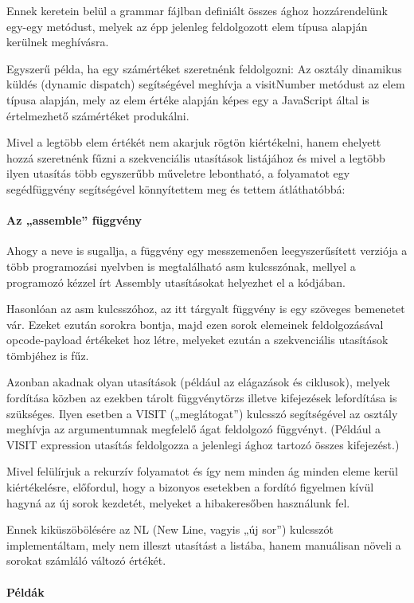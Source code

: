 Ennek keretein belül a grammar fájlban definiált összes ághoz hozzárendelünk egy-egy metódust, melyek az épp jelenleg feldolgozott elem típusa alapján kerülnek meghívásra.

Egyszerű példa, ha egy számértéket szeretnénk feldolgozni: Az osztály dinamikus küldés (dynamic dispatch) segítségével meghívja a visitNumber metódust az elem típusa alapján, mely az elem értéke alapján képes egy a JavaScript által is értelmezhető számértéket produkálni.

Mivel a legtöbb elem értékét nem akarjuk rögtön kiértékelni, hanem ehelyett hozzá szeretnénk fűzni a szekvenciális utasítások listájához és mivel a legtöbb ilyen utasítás több egyszerűbb műveletre lebontható, a folyamatot egy segédfüggvény segítségével könnyítettem meg és tettem átláthatóbbá:

\paragraph{Az „assemble” függvény}

Ahogy a neve is sugallja, a függvény egy messzemenően leegyszerűsített verziója a több programozási nyelvben is megtalálható asm kulcsszónak, mellyel a programozó kézzel írt Assembly utasításokat helyezhet el a kódjában.

Hasonlóan az asm kulcsszóhoz, az itt tárgyalt függvény is egy szöveges bemenetet vár. Ezeket ezután sorokra bontja, majd ezen sorok elemeinek feldolgozásával opcode-payload értékeket hoz létre, melyeket ezután a szekvenciális utasítások tömbjéhez is fűz.

Azonban akadnak olyan utasítások (például az elágazások és ciklusok), melyek fordítása közben az ezekben tárolt függvénytörzs illetve kifejezések lefordítása is szükséges. Ilyen esetben a VISIT („meglátogat”) kulcsszó segítségével az osztály meghívja az argumentumnak megfelelő ágat feldolgozó függvényt. (Például a VISIT expression utasítás feldolgozza a jelenlegi ághoz tartozó összes kifejezést.)

Mivel felülírjuk a rekurzív folyamatot és így nem minden ág minden eleme kerül kiértékelésre, előfordul, hogy a bizonyos esetekben a fordító figyelmen kívül hagyná az új sorok kezdetét, melyeket a hibakeresőben használunk fel.

Ennek kiküszöbölésére az NL (New Line, vagyis „új sor”) kulcsszót implementáltam, mely nem illeszt utasítást a listába, hanem manuálisan növeli a sorokat számláló változó értékét.

\paragraph{Példák}

